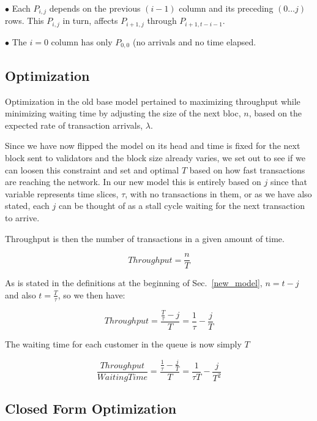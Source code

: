 \documentclass[conference]{IEEEtran}
\begin{document}
$\bullet$ Each $P_{i,j}$ depends on the previous $(i-1)$ column and its 
preceding $(0 ... j)$ rows. This $P_{i,j}$ in turn, affects $P_{i+1,j}$ through
$P_{i+1,t-i-1}$.

$\bullet$ The $i=0$ column has only $P_{0,0}$ (no arrivals and no time 
elapsed.

\subsection{Optimization}\label{optimization}

Optimization in the old base model pertained to maximizing throughput
while minimizing waiting time by adjusting the size of the next bloc, $n$,
based on the expected rate of transaction arrivals, $\lambda$. 

Since we have now flipped the model on its head and time is fixed for the next
block sent to validators and the block size already varies, we set out to see if
we can loosen this constraint and set and optimal $T$ based on how fast 
transactions are reaching the network. In our new model this is entirely based
on $j$ since that variable represents time slices, $\tau$, with no transactions in them,
or as we have also stated, each $j$ can be thought of as a stall cycle waiting for
the next transaction to arrive.

Throughput is then the number of transactions in a given amount of time. 

\begin{equation}
  Throughput = \frac{n}{T}\label{opt_1}
\end{equation}

As is stated in the definitions at the beginning of Sec.~\ref{new_model},
$n=t-j$ and also $t = \frac{T}{\tau}$, so we then have:

\begin{equation}
  Throughput = \frac{\frac{T}{\tau}-j}{T}=\frac{1}{\tau}-\frac{j}{T}\label{opt_2}
\end{equation}

The waiting time for each customer in the queue is now simply $T$

\begin{equation}
  \frac{Throughput}{WaitingTime} = \frac{\frac{1}{\tau}-\frac{j}{T}}{T} = \frac{1}{\tau T}-\frac{j}{T^2}\label{opt_2}
\end{equation}

\iffalse
\subsection{Closed Form Optimization}\label{closed_opt}
\end{document}
